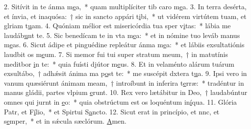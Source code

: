 2. Sitívit in te ánma m\uline{e}a,~* quam multiplíciter tib caro m\uline{e}a.
3. In terra desérta, et ínvia, et inaquósa:~† sic in sancto appári t\uline{i}bi,~* ut vidérem virtútem tuam, et glriam t\uline{u}am.
4. Quóniam mélior est misericórdia tua sper v\uline{i}tas:~* lábia me laudáb\uline{u}nt te.
5. Sic benedícam te in vta m\uline{e}a:~* et in nómine tuo leváb manus m\uline{e}as.
6. Sicut ádipe et pinguédine repleátur ánma m\uline{e}a:~* et lábiis exsultatiónis laudbit os m\uline{e}um.
7. Si memor fui tui super stratum meum,~† in matutínis meditbor \uline{i}n te:~* quia fuísti djútor m\uline{e}us.
8. Et in velaménto alárum tuárum exsultábo,~† adhǽsit ánima ma p\uline{o}st te:~* me suscépit dxtera t\uline{u}a.
9. Ipsi vero in vanum quæsiérunt ánimam meam,~† introíbunt in inferira t\uline{e}rræ:~* tradéntur in manus gládii, partes vlpium \uline{e}runt.
10. Rex vero lætábitur in Deo,~† laudabúntur omnes qui jurnt in \uline{e}o:~* quia obstrúctum est os loquéntum in\uline{í}qua.
11. Glória Patr, et F\uline{í}lio,~* et Spirtui S\uline{a}ncto.
12. Sicut erat in princípio, et nnc, et s\uline{e}mper,~* et in sǽcula sæclórum. \uline{A}men.
